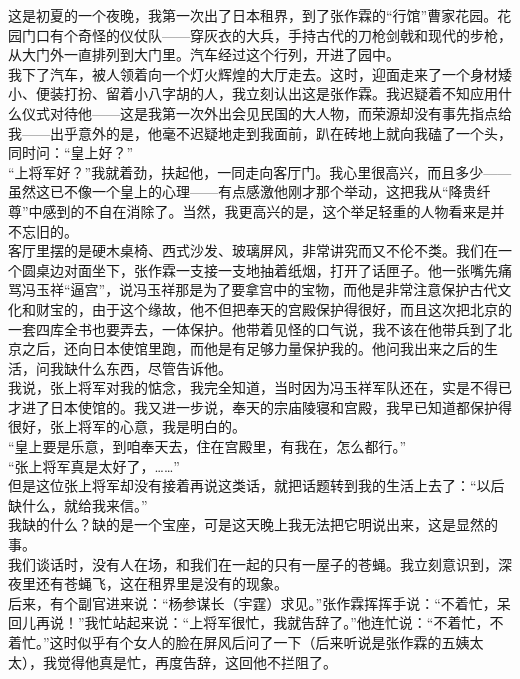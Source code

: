 这是初夏的一个夜晚，我第一次出了日本租界，到了张作霖的“行馆”曹家花园。花园门口有个奇怪的仪仗队——穿灰衣的大兵，手持古代的刀枪剑戟和现代的步枪，从大门外一直排列到大门里。汽车经过这个行列，开进了园中。\\

我下了汽车，被人领着向一个灯火辉煌的大厅走去。这时，迎面走来了一个身材矮小、便装打扮、留着小八字胡的人，我立刻认出这是张作霖。我迟疑着不知应用什么仪式对待他——这是我第一次外出会见民国的大人物，而荣源却没有事先指点给我——出乎意外的是，他毫不迟疑地走到我面前，趴在砖地上就向我磕了一个头，同时问：“皇上好？”\\

“上将军好？”我就着劲，扶起他，一同走向客厅门。我心里很高兴，而且多少——虽然这已不像一个皇上的心理——有点感激他刚才那个举动，这把我从“降贵纤尊”中感到的不自在消除了。当然，我更高兴的是，这个举足轻重的人物看来是并不忘旧的。\\

客厅里摆的是硬木桌椅、西式沙发、玻璃屏风，非常讲究而又不伦不类。我们在一个圆桌边对面坐下，张作霖一支接一支地抽着纸烟，打开了话匣子。他一张嘴先痛骂冯玉祥“逼宫”，说冯玉祥那是为了要拿宫中的宝物，而他是非常注意保护古代文化和财宝的，由于这个缘故，他不但把奉天的宫殿保护得很好，而且这次把北京的一套四库全书也要弄去，一体保护。他带着见怪的口气说，我不该在他带兵到了北京之后，还向日本使馆里跑，而他是有足够力量保护我的。他问我出来之后的生活，问我缺什么东西，尽管告诉他。\\

我说，张上将军对我的惦念，我完全知道，当时因为冯玉祥军队还在，实是不得已才进了日本使馆的。我又进一步说，奉天的宗庙陵寝和宫殿，我早已知道都保护得很好，张上将军的心意，我是明白的。\\

“皇上要是乐意，到咱奉天去，住在宫殿里，有我在，怎么都行。”\\

“张上将军真是太好了，……”\\

但是这位张上将军却没有接着再说这类话，就把话题转到我的生活上去了：“以后缺什么，就给我来信。”\\

我缺的什么？缺的是一个宝座，可是这天晚上我无法把它明说出来，这是显然的事。\\

我们谈话时，没有人在场，和我们在一起的只有一屋子的苍蝇。我立刻意识到，深夜里还有苍蝇飞，这在租界里是没有的现象。\\

后来，有个副官进来说：“杨参谋长（宇霆）求见。”张作霖挥挥手说：“不着忙，呆回儿再说！”我忙站起来说：“上将军很忙，我就告辞了。”他连忙说：“不着忙，不着忙。”这时似乎有个女人的脸在屏风后问了一下（后来听说是张作霖的五姨太太），我觉得他真是忙，再度告辞，这回他不拦阻了。\\

